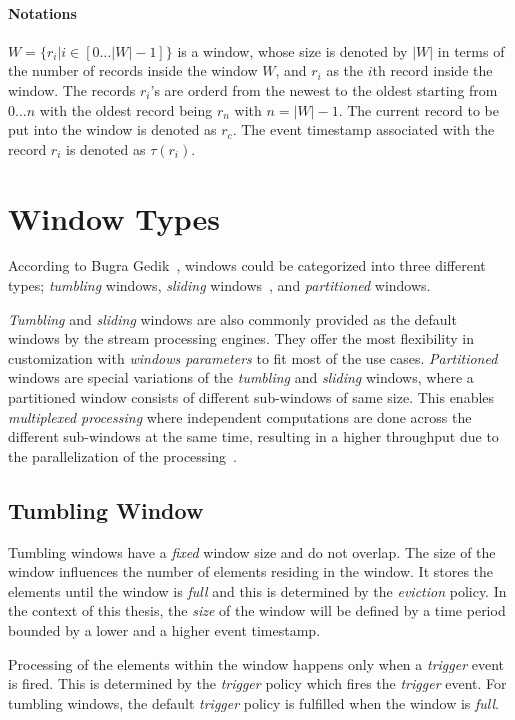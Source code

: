 \paragraph{Notations}%
$W = \{r_i | i \in [0\dots|W| - 1] \} $ is a window, whose size is denoted by $|W|$ in terms 
of the number of records inside the window $W$, and $r_i$ as the $i$th record inside 
the window. The records $r_i$'s are orderd from the newest to the oldest starting from 
$0\dots n$ with the oldest record being $r_n$ with $ n = |W| - 1$. The current record to be put 
into the window is denoted as $r_c$. The event timestamp associated with the
record $r_i$ is denoted as $\tau(r_i)$.

\section{Window Types}

According to Bugra Gedik~\cite{generic_window_sem}, windows could be categorized into 
three different types; \emph{tumbling} windows, 
\emph{sliding} windows~\cite{stream_standford,spade_stream}, and \emph{partitioned} windows.

\emph{Tumbling} and \emph{sliding} windows are also commonly provided as 
the default windows by the stream processing engines. 
They offer the most flexibility in customization with \emph{windows parameters} to fit 
most of the use cases.
\emph{Partitioned} windows are special variations of the \emph{tumbling} and
\emph{sliding} windows, where a partitioned window consists of different sub-windows of same size. 
This enables \emph{multiplexed processing} where independent computations are done across the 
different sub-windows at the same time, resulting in a higher throughput due to 
the parallelization of the processing~\cite{generic_window_sem}.

\subsection{Tumbling Window}%
\label{sec:Tumbling Window}
Tumbling windows have a \emph{fixed} window size and do not 
overlap. The size of the window influences 
the number of elements residing in the window. It stores the elements 
until the window is \emph{full} and this is determined by the \emph{eviction} policy. 
In the context of this thesis, the \emph{size} of the window will be defined by 
a time period bounded by a lower and a higher event timestamp. 

Processing of the elements within the window happens only when a \emph{trigger}
event is fired. This is determined by the \emph{trigger} policy which fires the 
\emph{trigger} event. For tumbling windows, the default \emph{trigger} policy is 
fulfilled when the window is \emph{full}.


